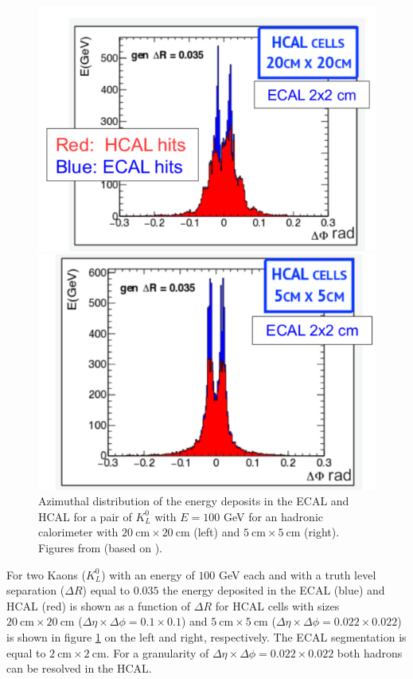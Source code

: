 \begin{figure}
	\centering
	\begin{minipage}{.5\textwidth}
		\centering
		\includegraphics[trim={0 0 0 .4cm},clip,width=\linewidth]{./Figures/hcal_gran_doubleK1.png}
	\end{minipage}%
	\begin{minipage}{.5\textwidth}
		\centering
		\includegraphics[width=\linewidth]{./Figures/hcal_gran_doubleK2.png}
	\end{minipage}
	\caption{Azimuthal distribution of the energy deposits in the ECAL and HCAL for a pair of $K_L^0$ with $E=100$ GeV for an hadronic calorimeter with $20~\text{cm}\times 20~\text{cm}$ (left) and $5~\text{cm}\times 5~\text{cm}$ (right). Figures from \cite{BOOST2017} (based on \cite{FCC_HCALgran_doubleK}).}
	\label{fig:hcal_gran_doubleK}
\end{figure}
For two Kaons ($K_L^0$) with an energy of $100$ GeV each and with a truth level separation ($\Delta R$) equal to $0.035$ the energy deposited in the ECAL (blue) and HCAL (red) is shown as a function of $\Delta R$ for HCAL cells with sizes $20~\text{cm}\times 20~\text{cm}$ ($\Delta \eta\times \Delta\phi=0.1\times 0.1$) and $5~\text{cm}\times 5~\text{cm}$ ($\Delta \eta\times \Delta\phi=0.022\times 0.022$) is shown in figure \ref{fig:hcal_gran_doubleK} on the left and right, respectively. The ECAL segmentation is equal to $2~\text{cm}\times 2~\text{cm}$. For a granularity of $\Delta \eta\times \Delta\phi=0.022\times 0.022$ both hadrons can be resolved in the HCAL.

